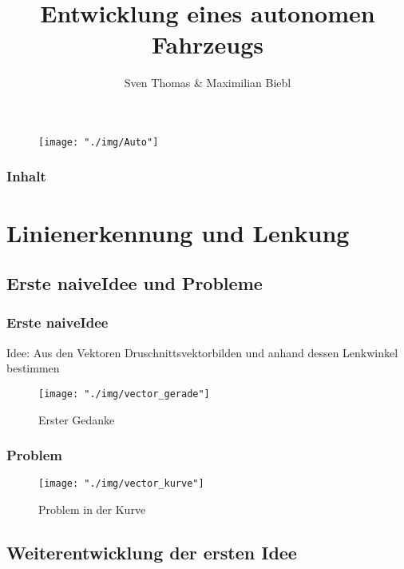 \documentclass{beamer}
\title[]{Entwicklung eines autonomen Fahrzeugs}
\author{Sven Thomas \& Maximilian Biebl}
\institute[THM]{Technische Hochschule Mittelhessen}
\date{}
\begin{document}
\begin{frame}
\titlepage
\begin{center}
\begin{figure}[h]
\centering
\texttt{[image: "./img/Auto"]}
\label{fig:Auto}
\end{figure}
\end{center}
\end{frame}

\begin{frame}
\frametitle{Inhalt}
\tableofcontents
\end{frame}

\section{Linienerkennung und Lenkung}
\subsection{Erste \glqq naive\grqq Idee und Probleme}

\begin{frame}
\frametitle{Erste \glqq naive\grqq  Idee}
Idee: Aus den Vektoren \glqq Druschnittsvektor\grqq \space bilden  und anhand dessen Lenkwinkel bestimmen
\begin{center}

\begin{figure}[h]
\centering
\texttt{[image: "./img/vector\_gerade"]}
\caption{Erster Gedanke}
\label{fig:Lenkung via Vektoren in Gerade}
\end{figure}

\end{center}
\end{frame}

\begin{frame}
\frametitle{Problem}
\begin{center}
\begin{figure}[h]
\centering
\texttt{[image: "./img/vector\_kurve"]}
\caption{Problem in der Kurve}
\label{fig:Lenkung via Vektoren in Kurve}
\end{figure}
\end{center}
\end{frame}

\subsection{Weiterentwicklung der ersten Idee}
\end{document}
